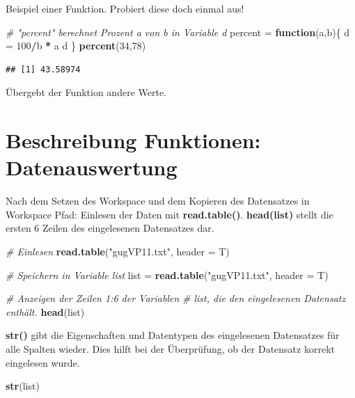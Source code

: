 \documentclass[]{book}
\newenvironment{Shaded}{\begin{snugshade}}{\end{snugshade}}
\newcommand{\KeywordTok}[1]{\textcolor[rgb]{0.13,0.29,0.53}{\textbf{#1}}}
\newcommand{\DataTypeTok}[1]{\textcolor[rgb]{0.13,0.29,0.53}{#1}}
\newcommand{\DecValTok}[1]{\textcolor[rgb]{0.00,0.00,0.81}{#1}}
\newcommand{\StringTok}[1]{\textcolor[rgb]{0.31,0.60,0.02}{#1}}
\newcommand{\CommentTok}[1]{\textcolor[rgb]{0.56,0.35,0.01}{\textit{#1}}}
\newcommand{\ControlFlowTok}[1]{\textcolor[rgb]{0.13,0.29,0.53}{\textbf{#1}}}
\newcommand{\OperatorTok}[1]{\textcolor[rgb]{0.81,0.36,0.00}{\textbf{#1}}}
\newcommand{\NormalTok}[1]{#1}
\begin{document}
Beispiel einer Funktion. Probiert diese doch einmal aus!

\begin{Shaded}
\begin{Highlighting}[]
\CommentTok{# "percent" berechnet Prozent a von b in Variable d}
\NormalTok{percent =}\StringTok{ }\ControlFlowTok{function}\NormalTok{(a,b)\{ }
\NormalTok{    d =}\StringTok{ }\DecValTok{100}\OperatorTok{/}\NormalTok{b }\OperatorTok{*}\StringTok{ }\NormalTok{a}
\NormalTok{    d}
\NormalTok{\}}
\KeywordTok{percent}\NormalTok{(}\DecValTok{34}\NormalTok{,}\DecValTok{78}\NormalTok{)}
\end{Highlighting}
\end{Shaded}

\begin{verbatim}
## [1] 43.58974
\end{verbatim}

Übergebt der Funktion andere Werte.

\chapter{Beschreibung Funktionen:
Datenauswertung}\label{beschreibung-funktionen-datenauswertung}

Nach dem Setzen des Workspace und dem Kopieren des Datensatzes in
Workspace Pfad: Einlesen der Daten mit \textbf{read.table()}.
\textbf{head(list)} stellt die ersten 6 Zeilen des eingelesenen
Datensatzes dar.

\begin{Shaded}
\begin{Highlighting}[]
\CommentTok{# Einlesen}
\KeywordTok{read.table}\NormalTok{(}\StringTok{"gugVP11.txt"}\NormalTok{, }\DataTypeTok{header =}\NormalTok{ T)}

\CommentTok{# Speichern in Variable list}
\NormalTok{list =}\StringTok{ }\KeywordTok{read.table}\NormalTok{(}\StringTok{"gugVP11.txt"}\NormalTok{, }\DataTypeTok{header =}\NormalTok{ T)}

\CommentTok{# Anzeigen der Zeilen 1:6 der Variablen }
\CommentTok{# list, die den eingelesenen Datensatz enthält.}
\KeywordTok{head}\NormalTok{(list)}
\end{Highlighting}
\end{Shaded}

\textbf{str()} gibt die Eigenschaften und Datentypen des eingelesenen
Datensatzes für alle Spalten wieder. Dies hilft bei der Überprüfung, ob
der Datensatz korrekt eingelesen wurde.

\begin{Shaded}
\begin{Highlighting}[]
\KeywordTok{str}\NormalTok{(list)}
\end{Highlighting}
\end{Shaded}
\end{document}
